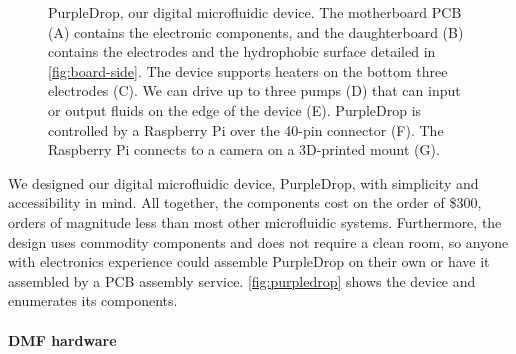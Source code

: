 \documentclass[sigplan, screen]{acmart}
\begin{document}
\begin{figure}
  \centering
  \caption{
    PurpleDrop, our digital microfluidic device.
    The motherboard PCB ({\sf A}) contains the electronic components, and the daughterboard ({\sf B}) contains the electrodes and the hydrophobic surface detailed in \autoref{fig:board-side}.
    The device supports heaters on the bottom three electrodes ({\sf C}).
    We can drive up to three pumps ({\sf D}) that can input or output fluids on the edge of the device ({\sf E}).
    PurpleDrop is controlled by a Raspberry Pi over the 40-pin connector ({\sf F}).
    The Raspberry Pi connects to a camera on a 3D-printed mount (\sf G).
  }
  \label{fig:purpledrop}

\end{figure}

We designed our digital microfluidic device, PurpleDrop, with simplicity and accessibility in mind.
All together, the components cost on the order of \$300, orders of magnitude less than most other microfluidic systems.
Furthermore, the design uses commodity components and does not require a clean room, so anyone with electronics experience could assemble PurpleDrop on their own or have it assembled by a PCB assembly service.
\autoref{fig:purpledrop} shows the device and enumerates its components.

\paragraph{DMF hardware}
\end{document}
